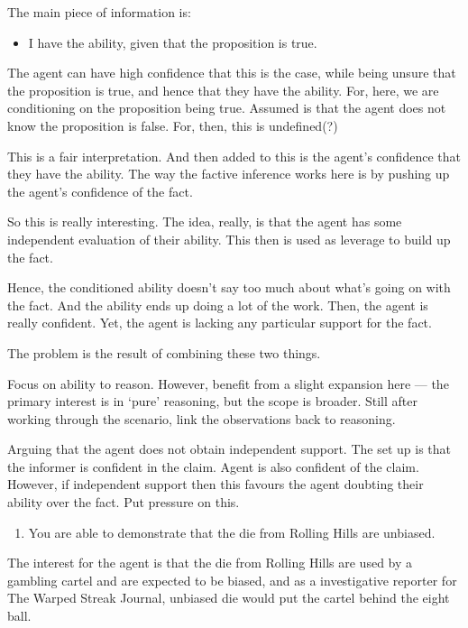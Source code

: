 \documentclass[10pt]{article}
\newcommand{\hozlinedash}[0]{%
  \noindent\hdashrule[0.5ex][c]{\textwidth}{.1pt}{2.5pt}
}
\begin{document}
\begin{note}
  The main piece of information is:
  \begin{itemize}
  \item I have the ability, given that the proposition is true.
  \end{itemize}
  The agent can have high confidence that this is the case, while being unsure that the proposition is true, and hence that they have the ability.
  For, here, we are conditioning on the proposition being true.
  Assumed is that the agent does not know the proposition is false.
  For, then, this is undefined(?)

  This is a fair interpretation.
  And then added to this is the agent's confidence that they have the ability.
  The way the factive inference works here is by pushing up the agent's confidence of the fact.

  So this is really interesting.
  The idea, really, is that the agent has some independent evaluation of their ability.
  This then is used as leverage to build up the fact.

  Hence, the conditioned ability doesn't say too much about what's going on with the fact.
  And the ability ends up doing a lot of the work.
  Then, the agent is really confident.
  Yet, the agent is lacking any particular support for the fact.

  The problem is the result of combining these two things.
\end{note}


\hozlinedash



Focus on ability to reason.
However, benefit from a slight expansion here --- the primary interest is in `pure' reasoning, but the scope is broader.
Still after working through the scenario, link the observations back to reasoning.

Arguing that the agent does not obtain independent support.
The set up is that the informer is confident in the claim.
Agent is also confident of the claim.
However, if independent support then this favours the agent doubting their ability over the fact.
Put pressure on this.


\begin{enumerate}
\item You are able to demonstrate that the die from Rolling Hills are unbiased.
\end{enumerate}

The interest for the agent is that the die from Rolling Hills are used by a gambling cartel and are expected to be biased, and as a investigative reporter for The Warped Streak Journal, unbiased die would put the cartel behind the eight ball.
\end{document}
